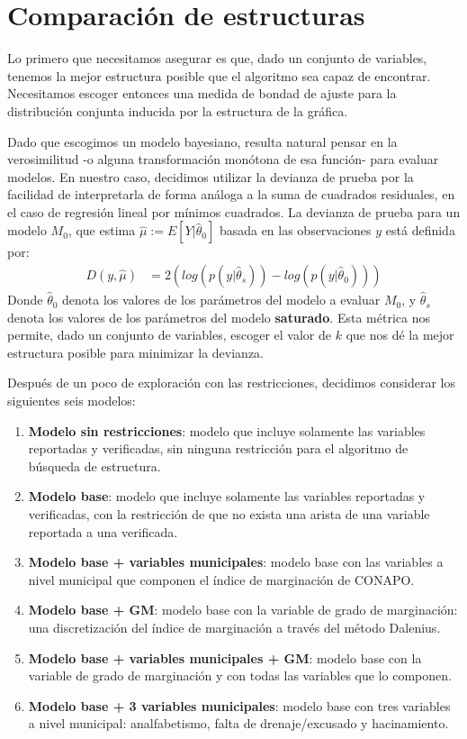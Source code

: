 \section*{Comparación de estructuras}
Lo primero que necesitamos asegurar es que, dado un conjunto de variables, tenemos la mejor estructura posible que el algoritmo sea capaz de encontrar. Necesitamos escoger entonces una medida de bondad de ajuste para la distribución conjunta inducida por la estructura de la gráfica.
\par
\noindent
Dado que escogimos un modelo bayesiano, resulta natural pensar en la verosimilitud -o alguna transformación monótona de esa función- para evaluar modelos. En nuestro caso, decidimos utilizar la devianza de prueba por la facilidad de interpretarla de forma análoga a la suma de cuadrados residuales, en el caso de regresión lineal por mínimos cuadrados. La devianza de prueba para un modelo $M_0$, que estima $\hat{\mu} := E[Y|\hat{\theta}_0]$ basada en las observaciones $y$ está definida por:
\begin{align*}
D(y, \hat{\mu}) &= 2(log(p(y|\hat{\theta}_s)) - log(p(y|\hat{\theta}_0)))
\end{align*}
Donde $\hat{\theta}_0$ denota los valores de los parámetros del modelo a evaluar $M_0$, y $\hat{\theta}_s$ denota los valores de los parámetros del modelo \textbf{saturado}. Esta métrica nos permite, dado un conjunto de variables, escoger el valor de $k$ que nos dé la mejor estructura posible para minimizar la devianza.
\par
\noindent
Después de un poco de exploración con las restricciones, decidimos considerar los siguientes seis modelos:
\begin{enumerate}
\item \textbf{Modelo sin restricciones}: modelo que incluye solamente las variables reportadas y verificadas, sin ninguna restricción para el algoritmo de búsqueda de estructura.
\item \textbf{Modelo base}: modelo que incluye solamente las variables reportadas y verificadas, con la restricción de que no exista una arista de una variable reportada a una verificada.
\item \textbf{Modelo base + variables municipales}: modelo base con las variables a nivel municipal que componen el índice de marginación de CONAPO.
\item \textbf{Modelo base + GM}: modelo base con la variable de grado de marginación: una discretización del índice de marginación a través del método Dalenius.
\item \textbf{Modelo base + variables municipales + GM}: modelo base con la variable de grado de marginación y con todas las variables que lo componen.
\item \textbf{Modelo base + 3 variables municipales}: modelo base con tres variables a nivel municipal: analfabetismo, falta de drenaje/excusado y hacinamiento.
\end{enumerate}
